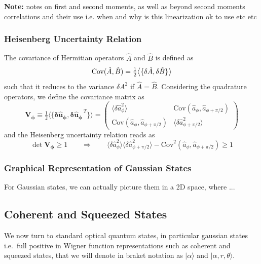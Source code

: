 \noindent \textbf{Note:} \color{red} notes on first and second moments, as well as beyond second moments correlations and their use i.e. when and why is this linearization ok to use etc etc \color{black}

\subsubsection{Heisenberg Uncertainty Relation }
The covariance of Hermitian operators \(\hat{A}\) and \(\hat{B}\) is defined as
\begin{equation}
    \mathrm{Cov}(\hat{A},\hat B) = \tfrac12 \big\langle \{ \delta\hat{A}, \delta\hat{B} \} \big\rangle \\
\end{equation}
such that it reduces to the variance $\delta A^2$ if $\hat{A}=\hat{B}$. Considering the quadrature operators, we define the covariance matrix as
\begin{equation}
\mathbf{V_\phi} \equiv \tfrac12 \big\langle \{  \mathbf{\delta \hat{u}_\phi},  \mathbf{\delta \hat{u}_\phi}^{\,T} \} \big\rangle
= \begin{pmatrix}
\langle \delta \hat{a}_\phi^2 \rangle &
\mathrm{Cov}(\hat{a}_\phi,\hat{a}_{\phi+\pi/2}) \\[4pt]
\mathrm{Cov}(\hat{a}_\phi,\hat{a}_{\phi+\pi/2})  &
\langle \delta \hat{a}_{\phi+\pi/2}^2 \rangle 
\end{pmatrix}
\end{equation}
and the Heisenberg uncertainty relation reads as
\begin{equation}
  \det \mathbf{V_\phi} \geq 1 \qquad \Rightarrow \qquad \langle  \delta \hat{a}^2_\phi \rangle \langle  \delta \hat{a}^2_{\phi+\pi/2} \rangle  - \mathrm{Cov}^2(\hat{a}_\phi,\hat{a}_{\phi+\pi/2})\geq 1
\end{equation}


\subsubsection{Graphical Representation of Gaussian States}
For Gaussian states, we can actually picture them in a 2D space, where ... 

\subsection{Coherent and Squeezed States}
We now turn to standard optical quantum states, in particular gaussian states i.e.\ full positive in Wigner function representations such as coherent and squeezed states, that we will denote in braket notation as $|\alpha\rangle$ and $|\alpha,r, \theta\rangle $.
